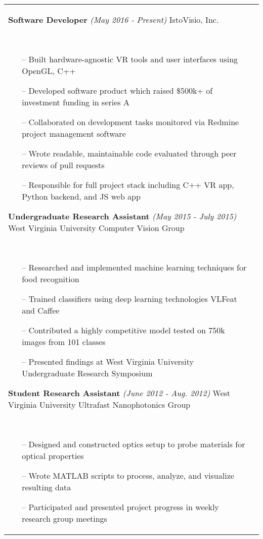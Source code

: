 \documentclass{article}
\begin{document}
\begin{tabular}{@{}p{2.5cm}@{\hspace{0.2cm}}p{13cm}@{}}
\enspace\textbf{Software Developer}
\hfill\small\textit{(May 2016 - Present)}\normalsize
\newline IstoVisio, Inc.
\par\,\small
\begin{itemize}[leftmargin=*,nolistsep,noitemsep]
  \item[--]Built hardware-agnostic VR tools and user interfaces using OpenGL, C++
  \item[--]Developed software product which raised \$500k+ of investment funding in series A
	\item[--]Collaborated on development tasks monitored via Redmine project management software
	\item[--]Wrote readable, maintainable code evaluated through peer reviews of pull requests
	\item[--]Responsible for full project stack including C++ VR app, Python backend, and JS web app
\newline
\end{itemize}
\normalsize

\textbf{Undergraduate Research Assistant}
\hfill\small\textit{(May 2015 - July 2015)}\normalsize
\newline West Virginia University Computer Vision Group
\par\,\small
\begin{itemize}[leftmargin=*,nolistsep,noitemsep]
  \item[--]Researched and implemented machine learning techniques for food recognition
  \item[--]Trained classifiers using deep learning technologies VLFeat and Caffee
  \item[--]Contributed a highly competitive model tested on 750k images from 101 classes
	\item[--]Presented findings at West Virginia University Undergraduate Research Symposium
\newline
\end{itemize}
\normalsize

\textbf{Student Research Assistant}
\hfill\small\textit{(June 2012 - Aug. 2012)}\normalsize
\newline West Virginia University Ultrafast Nanophotonics Group
\par\,\small
\begin{itemize}[leftmargin=*, nolistsep,noitemsep]
  \item[--]Designed and constructed optics setup to probe materials for optical properties
  \item[--]Wrote MATLAB scripts to process, analyze, and visualize resulting data
	\item[--]Participated and presented project progress in weekly research group meetings
\end{itemize}
\normalsize \\


\end{tabular}
\end{document}
